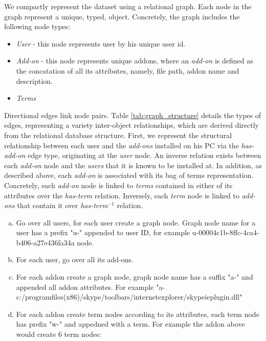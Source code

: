 \documentclass[11pt,oneside]{book}
\begin{document}
We compactly represent the dataset using a relational graph. Each node in the graph represent a unique, typed,  object.  Concretely, the graph includes the following node types:
\begin{itemize}
\renewcommand{\labelitemi}{$\bullet$} 
\item {\it User} - this node represents user by his unique user id. 
\item {\it Add-on} - this node represents unique addons, where an {\it add-on} is defined as the concatation of all its attributes, namely, file path, addon name and description.
\item {\it Terms} 
\end{itemize}
Directional edges link node pairs.
Table \ref{tab:graph_structure} details the types of edges, representing a variety inter-object relationships, which are derived directly from the relational database structure.
First, we represent the structural relationship between each user and the {\it add-ons} installed on his PC via the {\it has-add-on} edge type, originating at the {\it user} node. An inverse relation exists between each {\it add-on} node and the {\it users} that it is known to be installed at. 
In addition, as described above, each {\it add-on} is associated with its bag of terms representation. Concretely, each {\it add-on} node is linked to {\it terms} contained in either of its attributes over the {\it has-term} relation. Inversely, each {\it term} node is linked to {\it add-ons} that contain it over {\it has-term$^{-1}$} relation.



\iffalse
\begin{small}
\begin{enumerate}[(a)]
\item Go over all users, for each user create a graph node. Graph node name for a user has a prefix "u-" appended to user ID, for example u-00004c1b-8ffc-4ca4-b406-a27e436fa34a node.

\item For each user, go over all its add-ons.
\item For each addon create a graph node, graph node name has a suffix "a-" and appended all addon attributes. For example "a-c:/programfiles(x86)/skype/toolbars/internetexplorer/skypeieplugin.dll"
\item For each addon create term nodes according to its attributes, each term node has prefix "w-" and appedned with a term. For example the addon above would create 6 term nodes:
\end{enumerate}
\end{small}
\end{document}
